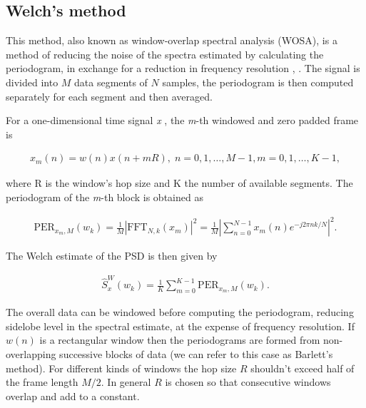 	
	\subsection{Welch's method}
	
	This method, also known as window-overlap spectral analysis (WOSA), is a method of reducing the noise of the spectra estimated by calculating the periodogram, in exchange for a reduction in frequency resolution \cite{Welch_period}, \cite{Spagnolini_ch14}.
	The signal is divided into $M$ data segments of $N$ samples, the periodogram is then computed separately for each segment and then averaged.
	
	For a one-dimensional time signal \textit{x} \cite{SASPWEB2011}, the \textit{m}-th windowed and zero padded frame is
	
	\begin{align}
		x_m(n) = w(n)x(n + mR), \; n=0,1,\ldots, M-1, m=0,1,\ldots, K-1,
	\end{align}
	
	where R is the window's hop size and K the number of available segments. The periodogram of the \textit{m}-th block is obtained as
	
	\begin{align}
		\text{PER}_{x_m,M}(w_k) = \frac{1}{M} |\text{FFT}_{N,k}(x_m)|^2 = \frac{1}{M}\left|\sum_{n=0}^{N-1}x_m(n)e^{-j2\pi nk/N}\right|^2.
	\end{align}
	
	The Welch estimate of the PSD is then given by
	
	\begin{align}
		\hat{S}^W_x(w_k) = \frac{1}{K}\sum_{m=0}^{K-1}\text{PER}_{x_m,M}(w_k).
	\end{align}
	
	The overall data can be windowed before computing the periodogram, reducing sidelobe level in the spectral estimate, at the expense of frequency resolution. If $w(n)$ is a rectangular window then the periodograms are formed from non-overlapping successive blocks of data (we can refer to this case as Barlett's method). For different kinds of windows the hop size $R$ shouldn't exceed half of the frame length $M/2$. In general $R$ is chosen so that consecutive windows overlap and add to a constant.
	
	
	

	

    
    
    